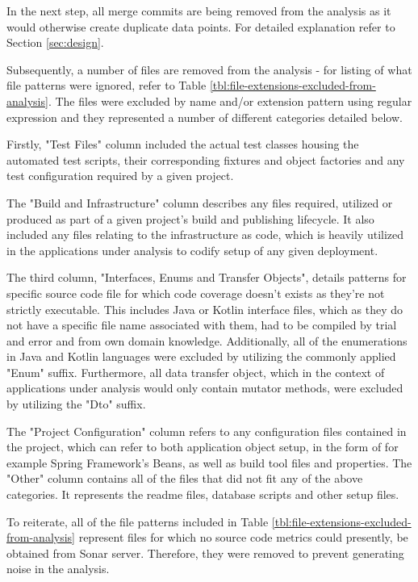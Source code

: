 In the next step, all merge commits are being removed from the analysis as it would otherwise create duplicate data points. For detailed explanation refer to Section \ref{sec:design}. 

Subsequently, a number of files are removed from the analysis - for listing of what file patterns were ignored, refer to Table \ref{tbl:file-extensions-excluded-from-analysis}. The files were excluded by name and/or extension pattern using regular expression and they represented a number of different categories detailed below. 

Firstly, "Test Files" column included the actual test classes housing the automated test scripts, their corresponding fixtures and object factories and any test configuration required by a given project.

The "Build and Infrastructure" column describes any files required, utilized or produced as part of a given project's build and publishing lifecycle. It also included any files relating to the infrastructure as code, which is heavily utilized in the applications under analysis to codify setup of any given deployment.

The third column, "Interfaces, Enums and Transfer Objects", details patterns for specific source code file for which code coverage doesn't exists as they're not strictly executable. This includes Java or Kotlin interface files, which as they do not have a specific file name associated with them, had to be compiled by trial and error and from own domain knowledge. Additionally, all of the enumerations in Java and Kotlin languages were excluded by utilizing the commonly applied "Enum" suffix. Furthermore, all data transfer object, which in the context of applications under analysis would only contain mutator methods, were excluded by utilizing the "Dto" suffix. 

The "Project Configuration" column refers to any configuration files contained in the project, which can refer to both application object setup, in the form of for example Spring Framework's Beans, as well as build tool files and properties. 
The "Other" column contains all of the files that did not fit any of the above categories. It represents the readme files, database scripts and other setup files.

To reiterate, all of the file patterns included in Table \ref{tbl:file-extensions-excluded-from-analysis} represent files for which no source code metrics could presently, be obtained from Sonar server. Therefore, they were removed to prevent generating noise in the analysis.


